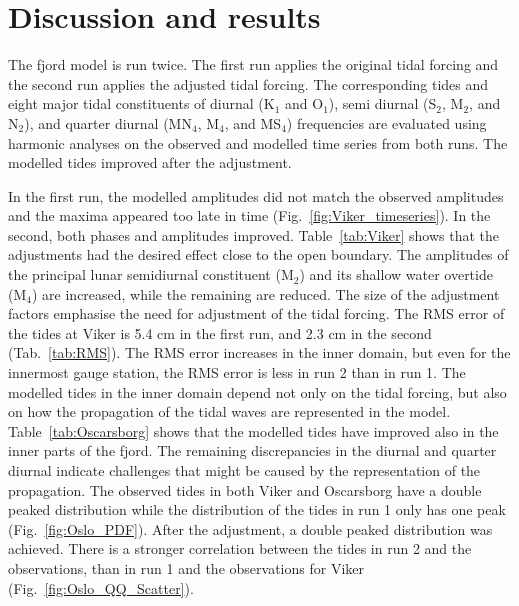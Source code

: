 \section{Discussion and results}
\label{sec:discuss}

The fjord model is run twice. The first run applies the original tidal forcing and the second run applies the adjusted tidal forcing. The corresponding tides and eight major tidal constituents of diurnal (K$_1$ and O$_1$), semi diurnal (S$_2$, M$_2$, and N$_2$), and quarter diurnal (MN$_4$, M$_4$, and MS$_4$) frequencies are evaluated using harmonic analyses on the observed and modelled time series from both runs. The modelled tides improved after the adjustment. 

In the first run, the modelled amplitudes did not match the observed amplitudes and the maxima appeared too late in time (Fig.~\ref{fig:Viker_timeseries}). In the second, both phases and amplitudes improved. 
Table~\ref{tab:Viker} shows that the adjustments had the desired effect close to the open boundary. The amplitudes of the principal lunar semidiurnal constituent (M$_2$) and its shallow water overtide (M$_4$) are increased, while the remaining are reduced. The size of the adjustment factors emphasise the need for adjustment of the tidal forcing. 
The RMS error of the tides at Viker is 5.4 cm in the first run, and 2.3 cm in the second (Tab.~\ref{tab:RMS}). The RMS error increases in the inner domain, but even for the innermost gauge station, the RMS error is less in run 2 than in run 1.
The modelled tides in the inner domain depend not only on the tidal forcing, but also on how the propagation of the tidal waves are represented in the model. Table~\ref{tab:Oscarsborg} shows that the modelled tides have improved also in the inner parts of the fjord. The remaining  discrepancies in the diurnal and quarter diurnal indicate challenges that might be caused by the representation of the propagation. 
The observed tides in both Viker and Oscarsborg have a double peaked distribution while the distribution of the tides in run 1 only has one peak (Fig.~\ref{fig:Oslo_PDF}). After the adjustment, a double peaked distribution was achieved.
There is a stronger correlation between the tides in run 2 and the observations, than in run 1 and the observations for Viker (Fig.~\ref{fig:Oslo_QQ_Scatter}). 


